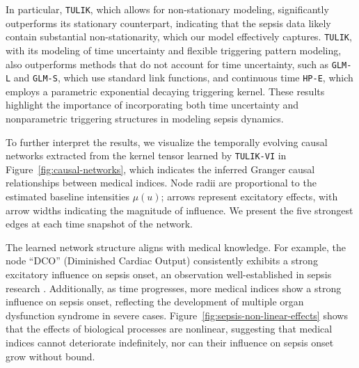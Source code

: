 \documentclass[11pt]{article}
\theoremstyle{remark}
\theoremstyle{plain}
\begin{document}
In particular, \texttt{TULIK}, which allows for non-stationary modeling, significantly outperforms its stationary counterpart, indicating that the sepsis data likely contain substantial non-stationarity, which our model effectively captures. \texttt{TULIK}, with its modeling of time uncertainty and flexible triggering pattern modeling, also outperforms methods that do not account for time uncertainty, such as \texttt{GLM-L} and \texttt{GLM-S}, which use standard link functions, and continuous time \texttt{HP-E}, which employs a parametric exponential decaying triggering kernel. These results highlight the importance of incorporating both time uncertainty and nonparametric triggering structures in modeling sepsis dynamics.

To further interpret the results, we visualize the temporally evolving causal networks extracted from the kernel tensor learned by \texttt{TULIK-VI} in Figure~\ref{fig:causal-networks}, which indicates the inferred Granger causal relationships between medical indices. Node radii are proportional to the estimated baseline intensities $\mu(u)$; arrows represent excitatory effects, with arrow widths indicating the magnitude of influence. We present the five strongest edges at each time snapshot of the network.

The learned network structure aligns with medical knowledge. For example, the node ``DCO'' (Diminished Cardiac Output) consistently exhibits a strong excitatory influence on sepsis onset, an observation well-established in sepsis research \cite{10366499}. Additionally, as time progresses, more medical indices show a strong influence on sepsis onset, reflecting the development of multiple organ dysfunction syndrome in severe cases. Figure~\ref{fig:sepsis-non-linear-effects} shows that the effects of biological processes are nonlinear, suggesting that medical indices cannot deteriorate indefinitely, nor can their influence on sepsis onset grow without bound. 
\end{document}
